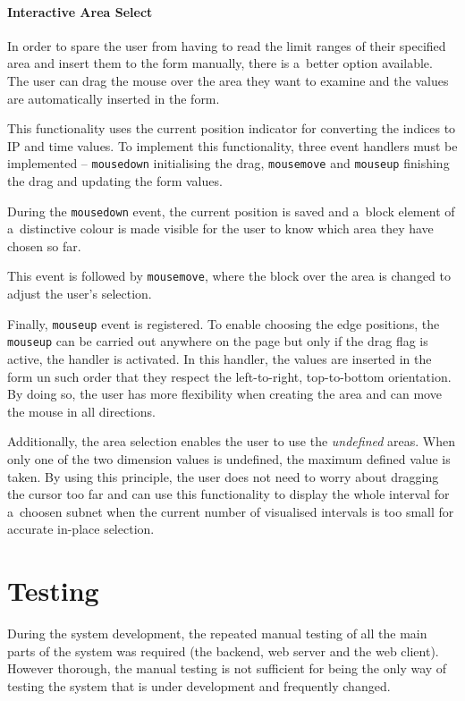 \subsubsection{Interactive Area Select}
In order to spare the user from having to read the limit ranges of their
specified area and insert them to the form manually, there is a~better
option available. The user can drag the mouse over the area they want
to examine and the values are automatically inserted in the form.

This functionality uses the current position indicator for converting
the indices to IP and time values. To implement this functionality,
three event handlers must be implemented --
\texttt{mousedown} initialising the drag, \texttt{mousemove} and
\texttt{mouseup} finishing the drag and updating the form values.

During the \texttt{mousedown} event, the current position is saved and a~block
element of a~distinctive colour is made visible for the user to know
which area they have chosen so far.

This event is followed by \texttt{mousemove}, where the block over the area
is changed to adjust the user's selection.

Finally, \texttt{mouseup} event is registered. To enable choosing
the edge positions, the \texttt{mouseup} can be carried out anywhere
on the page but only if the drag flag is active, the handler is activated.
In this handler, the values are inserted in the form un such order that
they respect the left-to-right, top-to-bottom orientation. By doing so,
the user has more flexibility when creating the area and can move the
mouse in all directions.

Additionally, the area selection enables the user to use the \textit{undefined}
areas. When only one of the two dimension values is undefined, the maximum
defined value is taken. By using this principle, the user does not need to
worry about dragging the cursor too far and can use this functionality to
display the whole interval for a~choosen subnet  when the current number
of visualised intervals is too small for accurate in-place selection.

\csdoublequotesoff

\chapter{Testing}\label{sec:chapter5}
During the system development, the repeated manual testing of all the main parts
of the system was required (the backend, web server and the web client).
However thorough, the manual testing is not sufficient for being the
only way of testing the system that is under development and frequently changed.

